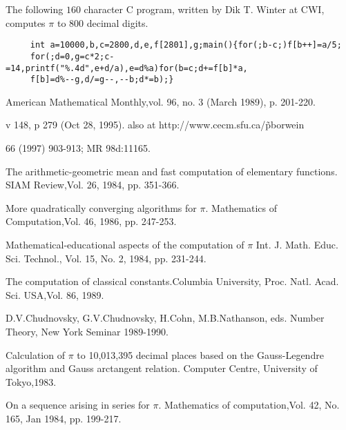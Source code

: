 The following $160$ character C program, written by Dik T. Winter at
CWI, computes $\pi$ to 800 decimal digits.

\begin{verbatim}
     int a=10000,b,c=2800,d,e,f[2801],g;main(){for(;b-c;)f[b++]=a/5;
     for(;d=0,g=c*2;c-=14,printf("%.4d",e+d/a),e=d%a)for(b=c;d+=f[b]*a,
     f[b]=d%--g,d/=g--,--b;d*=b);}
\end{verbatim}


\Ref

 {American Mathematical Monthly,}{vol. 96,
  no. 3 (March 1989), p. 201-220.}

 {v 148, p 279 (Oct 28,
  1995).  also at http://www.cecm.sfu.ca/\~pborwein }

  { 66 (1997)
  903-913; MR 98d:11165.}

  {The arithmetic-geometric mean
  and fast computation of elementary functions.}  {SIAM
  Review,}{Vol. 26, 1984, pp. 351-366.}

  {More quadratically converging
  algorithms for $\pi$.}  {Mathematics of Computation,}{Vol. 46, 1986,
  pp. 247-253.}

 {Mathematical-educational
  aspects of the computation of $\pi$}
{Int. J. Math. Educ. Sci. Technol.,} {Vol. 15, No. 2, 1984,
  pp. 231-244.}

  {The computation of
  classical constants.}{Columbia University,
  Proc. Natl. Acad. Sci. USA,}{Vol. 86, 1989.}

 {D.V.Chudnovsky, G.V.Chudnovsky, H.Cohn,
  M.B.Nathanson, eds.}  {Number Theory, New York Seminar 1989-1990.}

  {Calculation of $\pi$ to 10,013,395
  decimal places based on the Gauss-Legendre algorithm and Gauss
  arctangent relation.}  {Computer Centre, University of Tokyo,}{1983.}

  {On a sequence arising in
  series for $\pi$.}  {Mathematics of computation,}{Vol. 42, No. 165,
  Jan 1984, pp. 199-217.}


